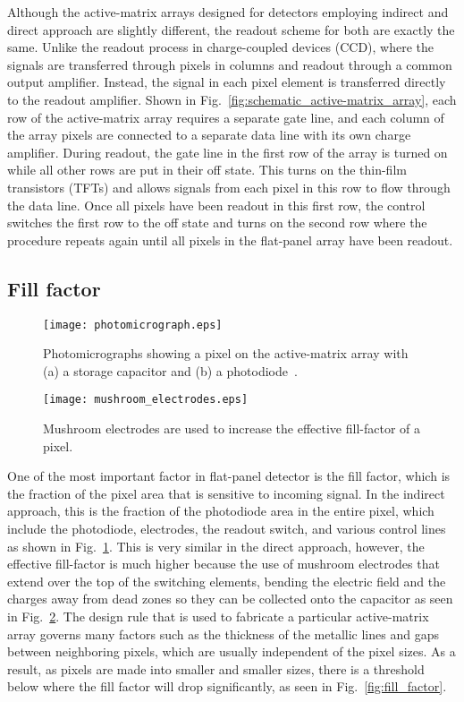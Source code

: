Although the active-matrix arrays designed for detectors employing indirect and direct approach are slightly different, the readout scheme for both are exactly the same.  Unlike the readout process in charge-coupled devices (CCD), where the signals are transferred through pixels in columns and readout through a common output amplifier.  Instead, the signal in each pixel element is transferred directly to the readout amplifier.  Shown in Fig.~\ref{fig:schematic_active-matrix_array}, each row of the active-matrix array requires a separate gate line, and each column of the array pixels are connected to a separate data line with its own charge amplifier.  During readout, the gate line in the first row of the array is turned on while all other rows are put in their off state.  This turns on the thin-film transistors (TFTs) and allows signals from each pixel in this row to flow through the data line.  Once all pixels have been readout in this first row, the control switches the first row to the off state and turns on the second row where the procedure repeats again until all pixels in the flat-panel array have been readout.  

\subsection{Fill factor}
%
\begin{figure}[h]
\texttt{[image: photomicrograph.eps]}
\caption{Photomicrographs showing a pixel on the active-matrix array with (a) a storage capacitor and (b) a photodiode~\citep{Rowlands2000}.}
\label{fig:pixel_fill_factor}
\end{figure}
%
\begin{figure}[h]
\texttt{[image: mushroom\_electrodes.eps]}
\caption{Mushroom electrodes are used to increase the effective fill-factor of a pixel.}
\label{fig:mushroom_electrodes}
\end{figure}

One of the most important factor in flat-panel detector is the fill factor, which is the fraction of the pixel area that is sensitive to incoming signal.  In the indirect approach, this is the fraction of the photodiode area in the entire pixel, which include the photodiode, electrodes, the readout switch, and various control lines as shown in Fig.~\ref{fig:pixel_fill_factor}.  This is very similar in the direct approach, however, the effective fill-factor is much higher because the use of mushroom electrodes that extend over the top of the switching elements, bending the electric field and the charges away from dead zones so they can be collected onto the capacitor as seen in Fig.~\ref{fig:mushroom_electrodes}.  The design rule that is used to fabricate a particular active-matrix array governs many factors such as the thickness of the metallic lines and gaps between neighboring pixels, which are usually independent of the pixel sizes.  As a result, as pixels are made into smaller and smaller sizes, there is a threshold below where the fill factor will drop significantly, as seen in Fig.~\ref{fig:fill_factor}.

